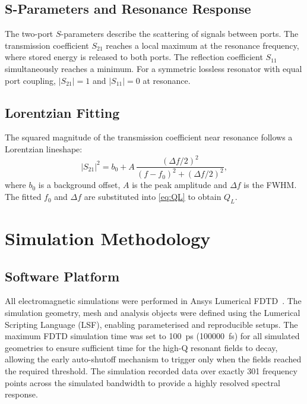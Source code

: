 \documentclass[12pt,a4paper]{article}
\begin{document}
\subsection{S-Parameters and Resonance Response}

The two-port $S$-parameters describe the scattering of signals between
ports. The transmission coefficient $S_{21}$ reaches a local maximum at
the resonance frequency, where stored energy is released to both ports.
The reflection coefficient $S_{11}$ simultaneously reaches a minimum.
For a symmetric lossless resonator with equal port coupling,
$|S_{21}| = 1$ and $|S_{11}| = 0$ at resonance.

\subsection{Lorentzian Fitting}

The squared magnitude of the transmission coefficient near resonance
follows a Lorentzian lineshape:
\begin{equation}
    |S_{21}|^2 = b_0 + A\,
    \frac{(\Delta f/2)^2}{(f - f_0)^2 + (\Delta f/2)^2},
    \label{eq:lorentzian}
\end{equation}
where $b_0$ is a background offset, $A$ is the peak amplitude and
$\Delta f$ is the FWHM. The fitted $f_0$ and $\Delta f$ are substituted
into \cref{eq:QL} to obtain $Q_L$.

\newpage
\section{Simulation Methodology}
\label{sec:methodology}

\subsection{Software Platform}

All electromagnetic simulations were performed in Ansys Lumerical
FDTD~\cite{Lumerical2024}. The simulation geometry, mesh and analysis
objects were defined using the Lumerical Scripting Language (LSF),
enabling parameterised and reproducible setups. The maximum FDTD simulation
time was set to \SI{100}{\pico\second} (\num{100000}~fs) for all simulated
geometries to ensure sufficient time for the high-Q resonant fields to
decay, allowing the early auto-shutoff mechanism to trigger only when the
fields reached the required threshold. The simulation recorded data over exactly 301 frequency points across the simulated bandwidth to provide a highly resolved spectral response.
\end{document}
